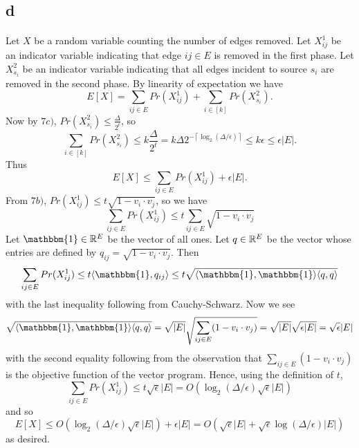\documentclass[letterpaper,12pt,oneside,onecolumn]{article}
\newcommand{\ceil}[1]{\ensuremath{\left\lceil#1\right\rceil}}
\begin{document}
\subsection{d}
\paragraph{}
Let $X$ be a random variable counting the number of edges removed. Let $X_{ij}^1$ be an indicator variable indicating that edge $ij \in E$ is removed in the first phase. Let $X_{s_i}^2$ be an indicator variable indicating that all edges incident to source $s_i$ are removed in the second phase. By linearity of expectation we have
$$E[X] = \sum_{ij \in E} Pr(X_{ij}^1) + \sum_{i \in [k]}Pr(X_{s_i}^2).$$
Now by $7c)$, $Pr(X_{s_i}^2) \leq \frac{\Delta}{2^t}$, so
$$ \sum_{i \in [k]}Pr(X_{s_i}^2) \leq k\frac{\Delta}{2^t} = k\Delta 2^{-\ceil{\log_2(\Delta /\epsilon)}} \leq k\epsilon \leq \epsilon |E|.$$
Thus
$$E[X] \leq \sum_{ij \in E} Pr(X_{ij}^1) + \epsilon |E|.$$
From $7b)$, $Pr(X_{ij}^1) \leq t\sqrt{1-v_i\cdot v_j}$, so we have
$$\sum_{ij \in E} Pr(X_{ij}^1) \leq t\sum_{ij \in E} \sqrt{1-v_i\cdot v_j}$$
Let $\mathbbm{1} \in \R^E$ be the vector of all ones. Let $q \in \mathbb{R}^E$ be the vector whose entries are defined by $q_{ij} = \sqrt{1-v_i\cdot v_j}$. Then 
$$\sum_{ij \in E} Pr(X_{ij}^1) \leq t \langle\mathbbm{1}, q_{ij} \rangle \leq t \sqrt{\langle \mathbbm{1}, \mathbbm{1}\rangle \langle q,q\rangle}$$
with the last inequality following from Cauchy-Schwarz. Now we see
$$\sqrt{\langle \mathbbm{1}, \mathbbm{1}\rangle \langle q,q\rangle} = \sqrt{|E|}\sqrt{\sum_{ij \in E} (1-v_i\cdot v_j)} = \sqrt{|E|}\sqrt{\epsilon |E|} = \sqrt{\epsilon}|E|$$
with the second equality following from the observation that $\sum_{ij \in E}(1-v_i\cdot v_j)$ is the objective function of the vector program. Hence, using the definition of $t$,
$$\sum_{ij \in E} Pr(X_{ij}^1) \leq t\sqrt{\epsilon}|E| = O(\log_2(\Delta/\epsilon)\sqrt{\epsilon}|E|)$$
and so
$$E[X] \leq O(\log_2(\Delta/\epsilon)\sqrt{\epsilon}|E|) + \epsilon |E| = O (\sqrt{\epsilon}|E| + \sqrt{\epsilon}\log(\Delta/\epsilon)|E|)$$
as desired.
\end{document}
